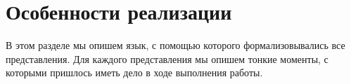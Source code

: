 \section{Особенности реализации}
\label{sec:impl}
В этом разделе мы опишем язык, с помощью которого формализовывались все представления. Для каждого представления мы опишем тонкие моменты, с которыми пришлось иметь дело в ходе выполнения работы.





